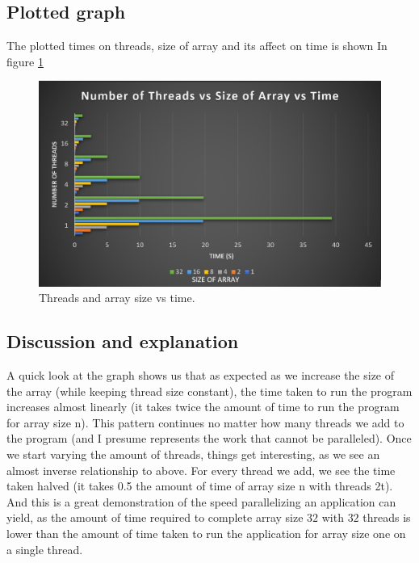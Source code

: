 \subsection{Plotted graph}

The plotted times on threads, size of array and its affect on time is shown In
figure \ref{fig:threasizetime}

\begin{figure}[!h]
    \centering
    \includegraphics[width=\linewidth]{Figures/graph.png}
    \caption{Threads and array size vs time.}
    \label{fig:threasizetime}
\end{figure}

\subsection{Discussion and explanation} 
A quick look at the graph shows us that as expected as we increase the size 
of the array (while keeping thread size constant), the time taken to run the 
program increases almost linearly (it takes twice the amount of time to run the 
program for array size n). This pattern continues no matter how many threads 
we add to the program (and I presume represents the work that cannot be 
paralleled). Once we start varying the amount of threads, things get 
interesting, as we see an almost inverse relationship to above. For every thread
we add, we see the time taken halved (it takes 0.5 the amount of time of array 
size n with threads 2t). And this is a great demonstration of the speed 
parallelizing an application can yield, as the amount of time required to 
complete array size $32$ with $32$ threads is lower than the amount of time taken
to run the application for array size one on a single thread.
